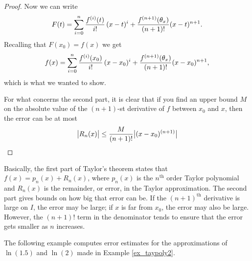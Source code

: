\begin{proof}
Now we can write 
$$
  F(t)=\sum_{i=0}^n{f^{(i)}(t)\over i!}\,(x-t)^i + 
  {f^{(n+1)}(\theta_x)\over (n+1)!}(x-t)^{n+1}.
$$
Recalling that $F(x_0)=f(x)$ we get
$$
  f(x)=\sum_{i=0}^n{f^{(i)}(x_0)\over i!}\,(x-x_0)^i + 
  {f^{(n+1)}(\theta_x)\over (n+1)!}(x-x_0)^{n+1},
$$
which is what we wanted to show.

For what concerns the second part, it is clear that if you find an upper bound $M$  on the absolute value of the $(n+1)$-st derivative of $f$ between $x_0$ and $x$, then the error can be at most
$$
\displaystyle \big|R_n(x)\big| \leq \frac{M}{(n+1)!}\big|(x-x_0)^{(n+1)}\big|
$$
\end{proof}

\fi

Basically, the first part of Taylor's theorem states that $f(x) = p_n(x) + R_n(x)$, where $p_n(x)$ is the $n^\text{th}$ order Taylor polynomial and $R_n(x)$ is the remainder, or error, in the Taylor approximation. The second part gives bounds on how big that error can be. If the $(n+1)^\text{th}$ derivative is large on $I$, the error may be large; if $x$ is far from $x_0$, the error may also be large. However, the $(n+1)!$ term in the denominator tends to ensure that the error gets smaller as $n$ increases.




%
%

The following example computes error estimates for the approximations of $\ln(1.5)$ and $\ln(2)$ made in Example \ref{ex_taypoly2}.

